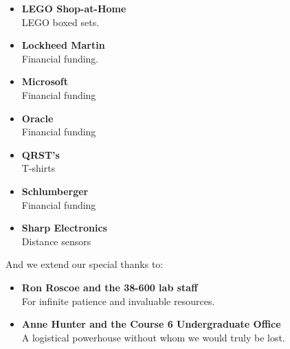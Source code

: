 \documentclass[12pt]{book}
\begin{document}
\begin{itemize}
\item {\bf LEGO Shop-at-Home}\\
LEGO boxed sets.

\item {\bf Lockheed Martin}\\
Financial funding.

\item {\bf Microsoft}\\
Financial funding

\item {\bf Oracle}\\
Financial funding

\item {\bf QRST's}\\
T-shirts

\item {\bf Schlumberger}\\
Financial funding

\item {\bf Sharp Electronics}\\
Distance sensors

\end{itemize}

And we extend our special thanks to:
\begin{itemize}

\item {\bf Ron Roscoe and the 38-600 lab staff}\\
For infinite patience and invaluable resources.

\item {\bf Anne Hunter and the Course 6 Undergraduate Office}\\
A logistical powerhouse without whom we would truly be lost.

\contents
\afterpreface

\end{itemize}

 

 
 









%

%

%
\end{document}

